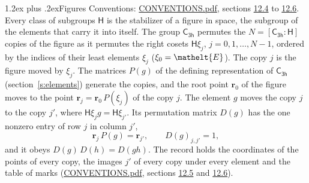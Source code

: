 \documentclass[10pt,a4paper]{article}
\makeatletter
\renewcommand\section{\@startsection{section}{1}{\z@}{-3ex plus -1ex minus -.2ex}%
  {1.2ex plus .2ex}{\normalfont\large\sffamily\bfseries\color{parttitle}}}
\numberwithin{equation}{section}
\newcommand{\eltfont}[1]{{\let\sigma\eltsigma\mathelt{#1}}}
\newcommand{\grp}[1]{\mathsf{#1}}
\newcommand{\cls}[1]{\eltfont{#1}}
\newcommand{\pointr}{\mathbf{r}}
\makeatother
\begin{document}
\section{Figures}\label{s:permutation}
Conventions: \href{../../CONVENTIONS.pdf}{CONVENTIONS.pdf}, sections \href{../../CONVENTIONS.pdf\#conv.12.4}{12.4} to \href{../../CONVENTIONS.pdf\#conv.12.6}{12.6}.
Every class of subgroups $\grp{H}$ is the stabilizer of a figure in space, the subgroup of the elements that carry it into itself. \label{n:local.orbit.size}\label{n:element.coset.least}\label{n:index.coset}The group $\grp{C_{3h}}$ permutes the $N = [\grp{C_{3h}} : \grp{H}]$ copies of the figure as it permutes the right cosets $\grp{H}\xi_j$, $j = 0, 1, \dots, N - 1$, ordered by the indices of their least elements $\xi_j$ ($\xi_0 = \cls{E}$). The copy $j$ is the figure moved by $\xi_j$. The matrices $P(g)$ of the defining representation of $\grp{C_{3h}}$ (section~\ref{s:elements}) generate the copies, and the root point $\pointr_0$ of the figure moves to the point $\pointr_j = \pointr_0\, P(\xi_j)$ of the copy $j$. \label{n:local.coset.image}The element $g$ moves the copy $j$ to the copy $j'$, where $\grp{H}\xi_j g = \grp{H}\xi_{j'}$. \label{n:local.matrix.permutation}Its permutation matrix $D(g)$ has the one nonzero entry of row $j$ in column $j'$,
\begin{equation}\label{e:perm.matrix}\pointr_j\, P(g) = \pointr_{j'}, \qquad D(g)_{j,j'} = 1,\end{equation}
and it obeys $D(g)\, D(h) = D(gh)$. The record holds the coordinates of the points of every copy, the images $j'$ of every copy under every element and the table of marks (\href{../../CONVENTIONS.pdf}{CONVENTIONS.pdf}, sections \href{../../CONVENTIONS.pdf\#conv.12.5}{12.5} and \href{../../CONVENTIONS.pdf\#conv.12.6}{12.6}).
\end{document}

